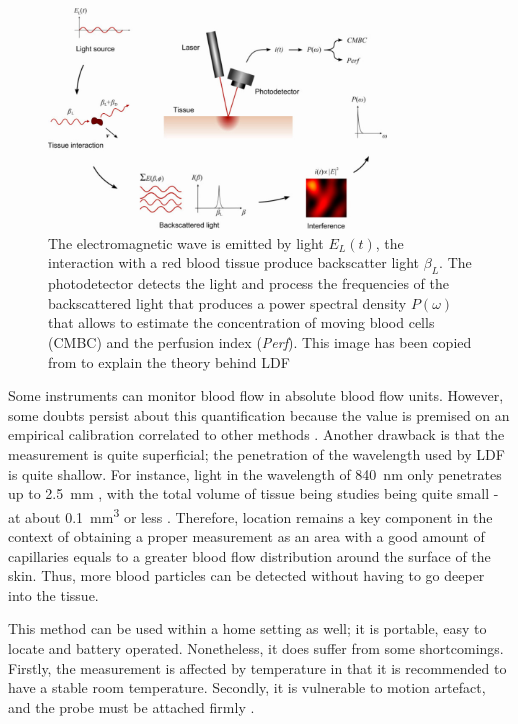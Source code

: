 \begin{figure}[!htpb]
	\centering
	\includegraphics[width=0.8\textwidth,keepaspectratio]{LDF}    
	\caption[Laser Doppler flowmetry theory overview]{The electromagnetic wave is emitted by light $E_L(t)$, the interaction with a red blood tissue produce backscatter light $\beta_L$. The photodetector detects the light and process the frequencies of the backscattered light that produces a power spectral density $P(\omega)$ that allows to estimate the concentration of moving blood cells (CMBC) and the perfusion index (\textit{Perf}). This image has been copied from \cite{fredriksson2007laser} to explain the theory behind LDF}
	\label{fig:LDF method}
\end{figure}

Some instruments can monitor blood flow in absolute blood flow units. However, some doubts persist about this quantification because the value is premised on an empirical calibration correlated to other methods \cite{cooke1990laser}. Another drawback is that the measurement is quite superficial; the penetration of the wavelength used by LDF is quite shallow. For instance, light in the wavelength of \SI{840}{\nano \metre} only penetrates up to \SI{2.5}{\milli\metre} \cite{bashkatov2005optical}, with the total volume of tissue being studies being quite small - at about \SI{0.1}{\cubic\mm} or less \cite{briers2013laser}. Therefore, location remains a key component in the context of obtaining a proper measurement as an area with a good amount of capillaries equals to a greater blood flow distribution around the surface of the skin. Thus, more blood particles can be detected without having to go deeper into the tissue. 

This method can be used within a home setting as well; it is portable, easy to locate and battery operated. Nonetheless, it does suffer from some shortcomings. Firstly, the measurement is affected by temperature in that it is recommended to have a stable room temperature. Secondly, it is vulnerable to motion artefact, and the probe must be attached firmly \cite{fredriksson2007laser}. 

